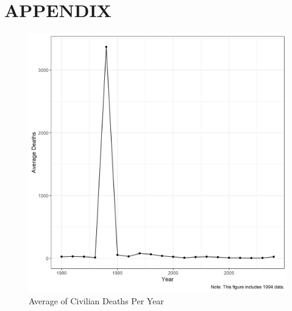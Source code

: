 \newpage
\section*{\normalfont \hfill APPENDIX \hfill}



\begin{figure}[h]
	\includegraphics[scale=.8]{appfig4_1}
	\caption{Average of Civilian Deaths Per Year}
\end{figure} 





